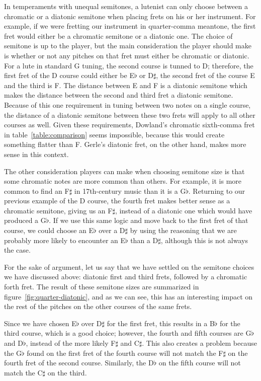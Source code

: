 In temperaments with unequal semitones, a lutenist can only choose between a chromatic
or a diatonic semitone when placing frets on his or her instrument.  For example, if we
were fretting our instrument in quarter-comma meantone, the first fret would either be
a chromatic semitone or a diatonic one.  The choice of semitone is up to the player,
but the main consideration the player should make is whether or not any pitches on that
fret must either be chromatic or diatonic.  For a lute in standard G tuning, the second
course is tunned to D; therefore, the first fret of the D course could either be
E$\flat$ or D$\sharp$, the second fret of the course E and the third is F.  The
distance between E and F is a diatonic semitone which makes the distance between the
second and third fret a diatonic semitone.  Because of this one requirement in tuning
between two notes on a single course, the distance of a diatonic semitone between these
two frets will apply to all other courses as well.  Given these requirements, Dowland's
chromatic sixth-comma fret in table~\ref{table:comparison} seems impossible, because
this would create something flatter than F.  Gerle's diatonic fret, on the other hand,
makes more sense in this context.

The other consideration players can make when choosing semitone size is that some
chromatic notes are more common than others.  For example, it is more common to find an
F$\sharp$ in 17th-century music than it is a G$\flat$.  Returning to our previous example
of the D course, the fourth fret makes better sense as a chromatic semitone, giving us an
F$\sharp$, instead of a diatonic one which would have produced a G$\flat$.  If we use this
same logic and move back to the first fret of that course, we could choose an E$\flat$
over a D$\sharp$ by using the reasoning that we are probably more likely to encounter an
E$\flat$ than a D$\sharp$, although this is not always the case.

For the sake of argument, let us say that we have settled on the semitone choices we have
discussed above: diatonic first and third frets, followed by a chromatic forth fret.  The
result of these semitone sizes are summarized in figure~\ref{fig:quarter-diatonic}, and as
we can see, this has an interesting impact on the rest of the pitches on the other courses
of the same frets.

Since we have chosen E$\flat$ over D$\sharp$ for the first fret, this results in a
B$\flat$ for the third course, which is a good choice; however, the fourth and fifth
courses are G$\flat$ and D$\flat$, instead of the more likely F$\sharp$ and C$\sharp$.
This also creates a problem because the G$\flat$ found on the first fret of the fourth
course will not match the F$\sharp$ on the fourth fret of the second course. Similarly,
the D$\flat$ on the fifth course will not match the C$\sharp$ on the third.

